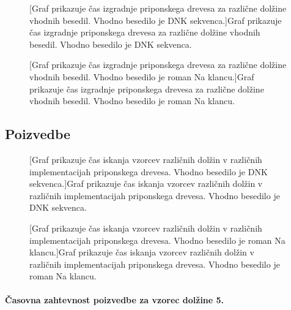 \begin{figure}[htb]
    \centering
    
    [Graf prikazuje čas izgradnje priponskega drevesa za različne dolžine vhodnih besedil. Vhodno besedilo je DNK sekvenca.]{Graf prikazuje čas izgradnje priponskega drevesa za različne dolžine vhodnih besedil. Vhodno besedilo je DNK sekvenca.} 
    \label{fig:IzgradnjaGraf}
\end{figure}

\begin{figure}[htb]
    
    [Graf prikazuje čas izgradnje priponskega drevesa za različne dolžine vhodnih besedil. Vhodno besedilo je roman Na klancu.]{Graf prikazuje čas izgradnje priponskega drevesa za različne dolžine vhodnih besedil. Vhodno besedilo je roman Na klancu.} 
    \label{fig:IzgradnjaGrafSLO}
\end{figure}


\subsection{Poizvedbe}

\begin{figure}[htb]
    
    [Graf prikazuje čas iskanja vzorcev različnih dolžin v različnih implementacijah priponskega drevesa. Vhodno besedilo je DNK sekvenca.]{Graf prikazuje čas iskanja vzorcev različnih dolžin v različnih implementacijah priponskega drevesa. Vhodno besedilo je DNK sekvenca.} 
    \label{fig:IskanjeGraf}
\end{figure}

\begin{figure}[htb]
    
    [Graf prikazuje čas iskanja vzorcev različnih dolžin v različnih implementacijah priponskega drevesa. Vhodno besedilo je roman Na klancu.]{Graf prikazuje čas iskanja vzorcev različnih dolžin v različnih implementacijah priponskega drevesa. Vhodno besedilo je roman Na klancu.} 
    \label{fig:IskanjeGrafSLO}
\end{figure}

\paragraph{Časovna zahtevnost poizvedbe za vzorec dolžine 5.}


